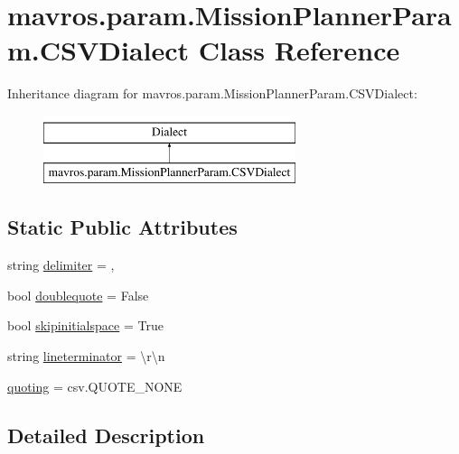 \hypertarget{classmavros_1_1param_1_1MissionPlannerParam_1_1CSVDialect}{}\section{mavros.\+param.\+Mission\+Planner\+Param.\+C\+S\+V\+Dialect Class Reference}
\label{classmavros_1_1param_1_1MissionPlannerParam_1_1CSVDialect}
Inheritance diagram for mavros.\+param.\+Mission\+Planner\+Param.\+C\+S\+V\+Dialect\+:\begin{figure}[H]
\begin{center}
\leavevmode
\includegraphics[height=2.000000cm]{classmavros_1_1param_1_1MissionPlannerParam_1_1CSVDialect}
\end{center}
\end{figure}
\subsection*{Static Public Attributes}
\begin{DoxyCompactItemize}
\item 
string \mbox{\hyperlink{classmavros_1_1param_1_1MissionPlannerParam_1_1CSVDialect_ac8aa6dd71913c87774faada21cfe6ac2}{delimiter}} = \textquotesingle{},\textquotesingle{}
\item 
bool \mbox{\hyperlink{classmavros_1_1param_1_1MissionPlannerParam_1_1CSVDialect_aa59335f6a786f5bebb5cf8324663ff6f}{doublequote}} = False
\item 
bool \mbox{\hyperlink{classmavros_1_1param_1_1MissionPlannerParam_1_1CSVDialect_a4bc6aa9683f05db9886a5761ddf89878}{skipinitialspace}} = True
\item 
string \mbox{\hyperlink{classmavros_1_1param_1_1MissionPlannerParam_1_1CSVDialect_a9bd50449495422c7a08a1b7513253568}{lineterminator}} = \textquotesingle{}\textbackslash{}r\textbackslash{}n\textquotesingle{}
\item 
\mbox{\hyperlink{classmavros_1_1param_1_1MissionPlannerParam_1_1CSVDialect_ad5ad8ae06bb19886b01ec52c3c5540e4}{quoting}} = csv.\+Q\+U\+O\+T\+E\+\_\+\+N\+O\+NE
\end{DoxyCompactItemize}


\subsection{Detailed Description}


